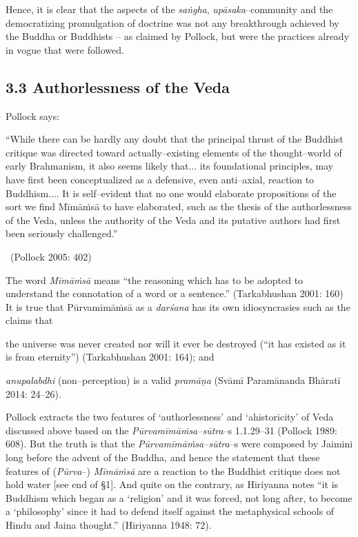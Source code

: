 Hence, it is clear that the aspects of the \textit{saṅgha}, \textit{upāsaka}–community and the democratizing promulgation of doctrine was not any breakthrough achieved by the Buddha or Buddhists – as claimed by Pollock, but were the practices already in vogue that were followed.


\subsection*{3.3 Authorlessness of the Veda}

Pollock says:

\begin{myquote}
“While there can be hardly any doubt that the principal thrust of the Buddhist critique was directed toward actually–existing elements of the thought–world of early Brahmanism, it also seems likely that... its foundational principles, may have first been conceptualized as a defensive, even anti–axial, reaction to Buddhism.... It is self–evident that no one would elaborate propositions of the sort we find Mīmāṁsā to have elaborated, such as the thesis of the authorlessness of the Veda, unless the authority of the Veda and its putative authors had first been seriously challenged.” 

~\hfill (Pollock 2005: 402)
\end{myquote}

The word \textit{Mīmāṁsā} means “the reasoning which has to be adopted to understand the connotation of a word or a sentence.” (Tarkabhushan 2001: 160) It is true that Pūrvamīmāṁsā as a \textit{darśana} has its own idiosyncrasies such as the claims that

\item the universe was never created nor will it ever be destroyed (“it has existed as it is from eternity”) (Tarkabhushan 2001: 164); and

 \item \textit{anupalabdhi} (non–perception) is a valid \textit{pramāṇa} (Svāmī Paramānanda Bhāratī 2014: 24–26).

Pollock extracts the two features of ‘authorlessness’ and ‘ahistoricity’ of Veda discussed above based on the \textit{Pūrvamīmāṁsa–sūtra}–s 1.1.29–31 (Pollock 1989: 608). But the truth is that the \textit{Pūrvamīmāṁsa–sūtra}–s were composed by Jaimini long before the advent of the Buddha, and hence the statement that these features of (\textit{Pūrva}–) \textit{Mīmāṁsā }are a reaction to the Buddhist critique does not hold water [see end of §1]. And quite on the contrary, as Hiriyanna notes “it is Buddhism which began as a ‘religion’ and it was forced, not long after, to become a ‘philosophy’ since it had to defend itself against the metaphysical schools of Hindu and Jaina thought.” (Hiriyanna 1948: 72).

